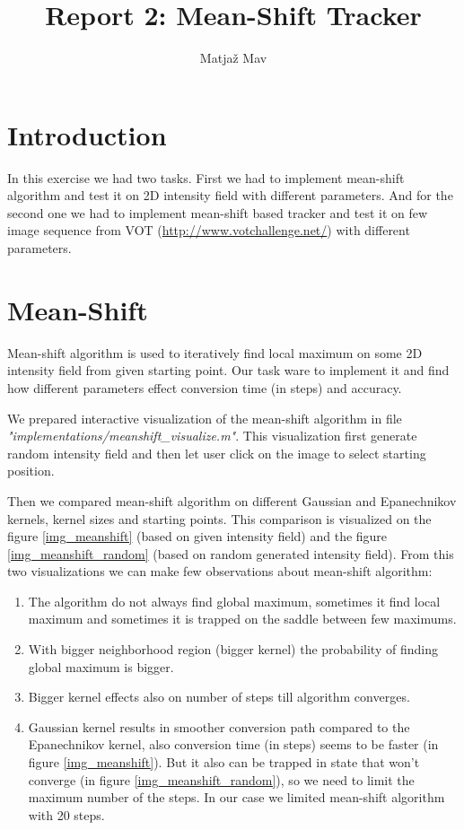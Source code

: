 \documentclass[runningheads]{llncs}
\begin{document}
% 
\title{Report 2: Mean-Shift Tracker}
\author{Matjaž Mav}
%
\maketitle              %
%
 
\section{Introduction}
In this exercise we had two tasks. First we had to implement mean-shift algorithm and test it on 2D intensity field with different parameters. And for the second one we had to implement mean-shift based tracker and test it on few image sequence from VOT (\url{http://www.votchallenge.net/}) with different parameters.

\section{Mean-Shift}
Mean-shift algorithm is used to iteratively find local maximum on some 2D intensity field from given starting point. Our task ware to implement it and find how different parameters effect conversion time (in steps) and accuracy.

We prepared interactive visualization of the mean-shift algorithm in file \textit{"implementations/meanshift\_visualize.m"}. This visualization first generate random intensity field and then let user click on the image to select starting position.

Then we compared mean-shift algorithm on different Gaussian and Epanechnikov kernels, kernel sizes and starting points. This comparison is visualized on the figure \ref{img_meanshift} (based on given intensity field) and the figure \ref{img_meanshift_random} (based on random generated intensity field). From this two visualizations we can make few observations about mean-shift algorithm:
\begin{enumerate}
    \item The algorithm do not always find global maximum, sometimes it find local maximum and sometimes it is trapped on the saddle between few maximums.
    \item With bigger neighborhood region (bigger kernel) the probability of finding global maximum is bigger.
    \item Bigger kernel effects also on number of steps till algorithm converges.
    \item Gaussian kernel results in smoother conversion path compared to the Epanechnikov kernel, also conversion time (in steps) seems to be faster (in figure \ref{img_meanshift}). But it also can be trapped in state  that won't  converge (in figure \ref{img_meanshift_random}), so we need to limit the maximum number of the steps. In our case we limited mean-shift algorithm with 20 steps.
\end{enumerate}
\end{document}
